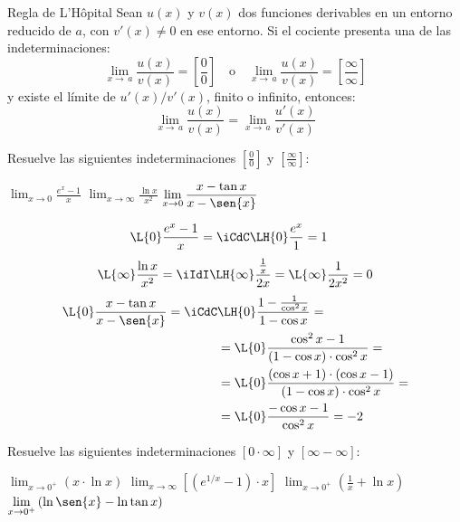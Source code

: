 \begin{definicion}{Regla de L'Hôpital}%
Sean $u(x)$ y $v(x)$ dos funciones derivables en un entorno reducido de $a$, con $v'(x)\ne0$ en ese entorno. Si el cociente presenta una de las indeterminaciones:
\[
\lim_{x\to\,a}\dfrac{u(x)}{v(x)}=\left[\dfrac00\right]
    \quad\text{o}\quad
\lim_{x\to\,a}\dfrac{u(x)}{v(x)}=\left[\dfrac{\infty}{\infty}\right] 
\]
y existe el límite de $u'(x)/v'(x)$, finito o infinito, entonces:
\[
\lim_{x\to\,a}\dfrac{u(x)}{v(x)}=\lim_{x\to\,a}\dfrac{u'(x)}{v'(x)}
\]
\end{definicion}

\begin{ejemplo}{
    Resuelve las siguientes indeterminaciones $\left[\frac00\right]$ y $\left[\frac{\infty}{\infty}\right]$:
    \begin{apartadosc}
        \ap $\displaystyle{
                \lim_{x\to0}\frac{e^x-1}{x}
            }$
        \ap $\displaystyle{
                \lim_{x\to\infty}\frac{\ln{x}}{x^2}
            }$
        \ap $\displaystyle{
                \lim_{x\to0}\frac{x-\tan{x}}{x-\sen{x}}
            }$
    \end{apartadosc}
}
\[\begin{aligned}
    \L{0}\frac{e^x-1}{x}=\iCdC&\LH{0}\frac{e^x}{1}=1
\end{aligned}\]
\[\begin{aligned}
    \L{\infty}\frac{\ln{x}}{x^2}=\iIdI&\LH{\infty}\frac{\frac1x}{2x}=\L{\infty}\frac1{2x^2}=0\\
\end{aligned}\]
\[\begin{aligned}
    \L{0}\frac{x-\tan{x}}{x-\sen{x}}=\iCdC
        &\LH{0}\frac{1-\frac1{\cos^2{x}}}{1-\cos{x}}=\\
        &=\L{0}\frac{\cos^2{x}-1}{(1-\cos{x})\cdot\cos^2{x}}=\\
        &=\L{0}\frac{(\cos{x}+1)\cdot(\cos{x}-1)}{(1-\cos{x})\cdot\cos^2{x}}=\\
        &=\L{0}\frac{-\cos{x}-1}{\cos^2{x}}=-2
\end{aligned}\]
\end{ejemplo}

\begin{ejemplo}{
    Resuelve las siguientes indeterminaciones $\left[0\cdot\infty\right]$ y $\left[\infty-\infty\right]$:
    \begin{apartadosc}
        \ap $\displaystyle{
                \lim_{x\to0^+}\left(x\cdot\ln{x}\right)
            }$
        \ap $\displaystyle{
                \lim_{x\to\infty}\left[(e^{1/x}-1)\cdot x\right]
            }$
        \ap $\displaystyle{
                \lim_{x\to0^+}\left(\frac1x+\ln{x}\right)
            }$
        \ap $\displaystyle{
                \lim_{x\to0^+}\left(\ln\sen{x}-\ln\tan{x}\right)
            }$
    \end{apartadosc}
}
\end{ejemplo}

